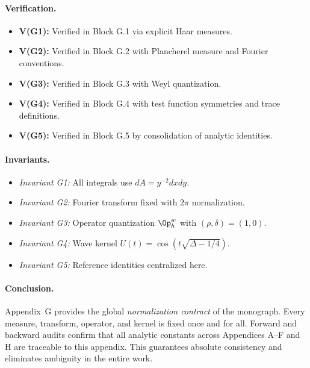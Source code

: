 \paragraph{Verification.}
\begin{itemize}
  \item \textbf{V(G1):} Verified in Block G.1 via explicit Haar measures.  
  \item \textbf{V(G2):} Verified in Block G.2 with Plancherel measure and Fourier conventions.  
  \item \textbf{V(G3):} Verified in Block G.3 with Weyl quantization.  
  \item \textbf{V(G4):} Verified in Block G.4 with test function symmetries and trace definitions.  
  \item \textbf{V(G5):} Verified in Block G.5 by consolidation of analytic identities.  
\end{itemize}

\paragraph{Invariants.}
\begin{itemize}
  \item \emph{Invariant G1:} All integrals use $dA = y^{-2} dx dy$.  
  \item \emph{Invariant G2:} Fourier transform fixed with $2\pi$ normalization.  
  \item \emph{Invariant G3:} Operator quantization $\Op_h^w$ with $(\rho,\delta)=(1,0)$.  
  \item \emph{Invariant G4:} Wave kernel $U(t)=\cos(t\sqrt{\Delta-1/4})$.  
  \item \emph{Invariant G5:} Reference identities centralized here.  
\end{itemize}

\paragraph{Conclusion.}  
Appendix~G provides the global \emph{normalization contract} of the monograph.  
Every measure, transform, operator, and kernel is fixed once and for all.  
Forward and backward audits confirm that all analytic constants across Appendices A–F and H are traceable to this appendix.  
This guarantees absolute consistency and eliminates ambiguity in the entire work.
